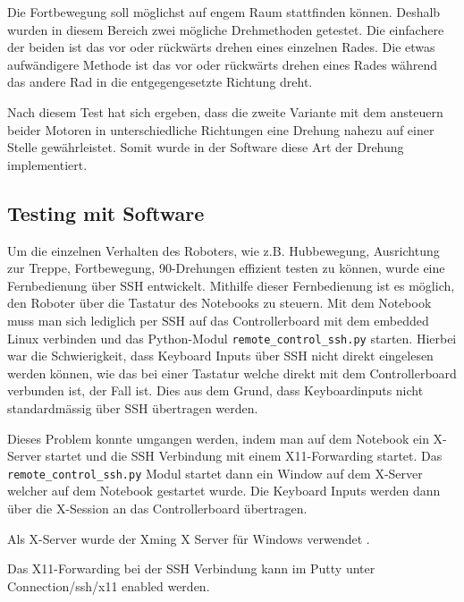 Die Fortbewegung soll möglichst auf engem Raum stattfinden können. Deshalb wurden in diesem Bereich zwei mögliche Drehmethoden getestet. Die einfachere der beiden ist das vor oder rückwärts drehen eines einzelnen Rades. Die etwas aufwändigere Methode ist das vor oder rückwärts drehen eines Rades während das andere Rad in die entgegengesetzte Richtung dreht.

Nach diesem Test hat sich ergeben, dass die zweite Variante mit dem ansteuern beider Motoren in unterschiedliche Richtungen eine Drehung nahezu auf einer Stelle gewährleistet. Somit wurde in der Software diese Art der Drehung implementiert.

\subsection{Testing mit Software}\label{subsec:Fernbedienung}
Um die einzelnen Verhalten des Roboters, wie z.B. Hubbewegung, Ausrichtung zur Treppe, Fortbewegung, 90\textdegree-Drehungen effizient testen zu können, wurde eine Fernbedienung über SSH entwickelt. Mithilfe dieser Fernbedienung ist es möglich, den Roboter über die Tastatur des Notebooks zu steuern. Mit dem Notebook muss man sich lediglich per SSH auf das Controllerboard mit dem embedded Linux verbinden und das Python-Modul \texttt{remote\_control\_ssh.py} starten. Hierbei war die Schwierigkeit, dass Keyboard Inputs über SSH nicht direkt eingelesen werden können, wie das bei einer Tastatur welche direkt mit dem Controllerboard verbunden ist, der Fall ist. Dies aus dem Grund, dass Keyboardinputs nicht standardmässig über SSH übertragen werden. 

Dieses Problem konnte umgangen werden, indem man auf dem Notebook ein X-Server \cite{Wikipedia-X-Window-System} startet und die SSH Verbindung mit einem X11-Forwarding startet. Das \texttt{remote\_control\_ssh.py} Modul startet dann ein Window auf dem X-Server welcher auf dem Notebook gestartet wurde. Die Keyboard Inputs werden dann über die X-Session an das Controllerboard übertragen. 

Als X-Server wurde der Xming X Server für Windows verwendet \cite{Xming-X-Window-Server-Download}.

Das X11-Forwarding bei der SSH Verbindung kann im Putty unter Connection/ssh/x11 enabled werden. 

